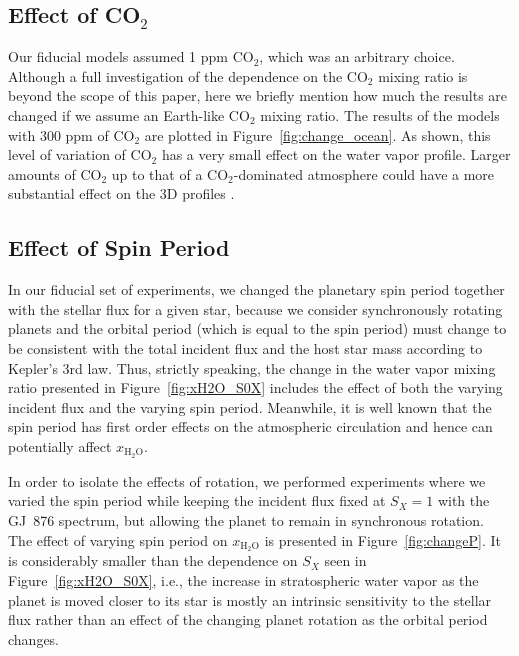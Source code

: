 \documentclass[11pt,numberedappendix,twocolappendix,]{emulateapj}
\def\water{H$_2$O}
\def\xwater{$x_\text{\water}$}
\def\wv{water vapor}
\begin{document}
\subsection{Effect of CO$_2$}
\label{ss:sensitivity_CO2}

Our fiducial models assumed 1 ppm CO$_2$, which was an arbitrary choice. 
Although a full investigation of the dependence on the CO$_2$ mixing ratio is beyond the scope of this paper, here we briefly mention how much the results are changed if we assume an Earth-like CO$_2$ mixing ratio. 
The results of the models with 300 ppm of CO$_2$ are plotted in Figure~\ref{fig:change_ocean}. 
As shown, this level of variation of CO$_2$ has a very small effect on the \wv{} profile. 
Larger amounts of CO$_2$ up to that of a CO$_2$-dominated atmosphere could have a more substantial effect on the 3D profiles \citep{Wordsworth2013}. 


\subsection{Effect of Spin Period}
\label{ss:sensitivity_Porbit}

In our fiducial set of experiments, we changed the planetary spin period together with the stellar flux for a given star, because we consider synchronously rotating planets and the orbital period (which is equal to the spin period) must change to be consistent with the total incident flux and the host star mass according to Kepler's 3rd law. 
Thus, strictly speaking, the change in the \wv{} mixing ratio presented in Figure~\ref{fig:xH2O_S0X} includes the effect of both the varying incident flux and the varying spin period. 
Meanwhile, it is well known that the spin period has first order effects on the atmospheric circulation and hence can potentially affect \xwater{}. 

In order to isolate the effects of rotation, we performed experiments where we varied the spin period while keeping the incident flux fixed at $S_X=1$ with the GJ~876 spectrum, but allowing the planet to remain in synchronous rotation. 
The effect of varying spin period on \xwater{} is presented in Figure~\ref{fig:changeP}. 
It is considerably smaller than the dependence on $S_X$ seen in Figure~\ref{fig:xH2O_S0X}, i.e., the increase in stratospheric water vapor as the planet is moved closer to its star is mostly an intrinsic sensitivity to the stellar flux rather than an effect of the changing planet rotation as the orbital period changes. 
\end{document}
